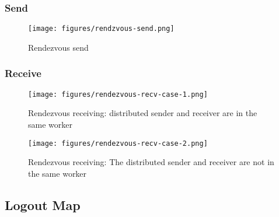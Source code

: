 \begin{content}
\subsubsection{Send}

\begin{figure}[H]
  \centering
  \texttt{[image: figures/rendzvous-send.png]}
  \caption{Rendezvous send}
  \label{fig:rendzvous-send}
\end{figure}


\subsubsection{Receive}

\begin{figure}[H]
  \centering
  \texttt{[image: figures/rendezvous-recv-case-1.png]}
  \caption{Rendezvous receiving: distributed sender and receiver are in the same worker}
  \label{fig:rendezvous-recv-case-1}
\end{figure}

\begin{figure}[H]
  \centering
  \texttt{[image: figures/rendezvous-recv-case-2.png]}
  \caption{Rendezvous receiving: The distributed sender and receiver are not in the same worker}
  \label{fig:rendezvous-recv-case-2}
\end{figure}


\subsection{Logout Map}

\end{content}


